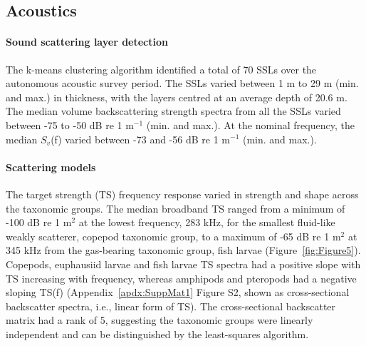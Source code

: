 
\subsection{Acoustics}
\paragraph{Sound scattering layer detection}
The k-means clustering algorithm identified a total of 70 SSLs over the autonomous acoustic survey period. The SSLs varied between 1 m to 29 m (min. and max.) in thickness, with the layers centred at an average depth of 20.6 m. The median volume backscattering strength spectra from all the SSLs varied between -75 to -50 dB re 1 m$^{-1}$ (min. and max.). At the nominal frequency, the median $S_{v}$(f) varied between -73 and -56 dB re 1 m$^{-1}$ (min. and max.).
\paragraph{Scattering models}
The target strength (TS) frequency response varied in strength and shape across the taxonomic groups. The median broadband TS ranged from a minimum of -100 dB re 1 m$^2$ at the lowest frequency, 283 kHz, for the smallest fluid-like weakly scatterer, copepod taxonomic group, to a maximum of -65 dB re 1 m$^2$ at 345 kHz from the gas-bearing taxonomic group, fish larvae (Figure~\ref{fig:Figure5}). Copepods, euphausiid larvae and fish larvae TS spectra had a positive slope with TS increasing with frequency, whereas amphipods and pteropods had a negative sloping TS(f) (Appendix~\ref{apdx:SuppMat1} Figure S2, shown as cross-sectional backscatter spectra, i.e., linear form of TS). The cross-sectional backscatter matrix had a rank of 5, suggesting the taxonomic groups were linearly independent and can be distinguished by the least-squares algorithm. 
 

